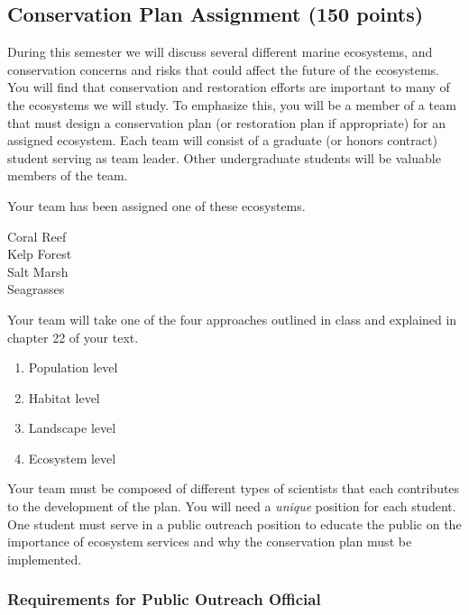 \documentclass[12pt, hidelinks]{exam}
\begin{document}
\subsection*{Conservation Plan Assignment (150 points)}

During this semester we will discuss several different marine 
ecosystems, and conservation concerns and risks that could 
affect the future of the ecosystems. You will find that
conservation and restoration efforts are important to many of the
ecosystems we will study. To emphasize this, you will be a member of a team
that must design a conservation plan (or restoration plan if appropriate) for an assigned ecosystem.
Each team will consist of a graduate (or honors contract) student serving as team leader. Other undergraduate students will be valuable members of the team.

Your team has been assigned one of these ecosystems.%

\begin{multicols}{2}

Coral Reef\\ 
Kelp Forest\\ 
Salt Marsh\\
Seagrasses

\end{multicols}

Your team will take one of the four approaches outlined in class and explained in chapter 22 of your text.

\begin{multicols}{2}
\begin{enumerate}
\def\labelenumi{\arabic{enumi}.}
\item
  Population level
\item
  Habitat level
\item
  Landscape level
\item
  Ecosystem level
\end{enumerate}
\end{multicols}

Your team must be composed of different types of scientists that each contributes
to the development of the plan. You will need a \emph{unique} position for each student. One student must serve in a public outreach position to educate the public on the importance of ecosystem services and why the conservation plan must be implemented. 

\subsubsection*{Requirements for Public Outreach Official}
\end{document}
